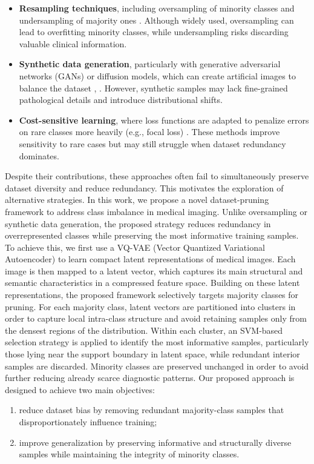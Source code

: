\documentclass[twocolumn]{svjour3}
\begin{document}
\begin{itemize}
 \item \textbf{Resampling techniques}, including oversampling of minority classes and undersampling of majority ones \cite{ref5}. Although widely used, oversampling can lead to overfitting minority classes, while undersampling risks discarding valuable clinical information.
 \item \textbf{Synthetic data generation}, particularly with generative adversarial networks (GANs) or diffusion models, which can create artificial images to balance the dataset \cite{ref6}, \cite{ref7}. However, synthetic samples may lack fine-grained pathological details and introduce distributional shifts.
 \item \textbf{Cost-sensitive learning}, where loss functions are adapted to penalize errors on rare classes more heavily (e.g., focal loss) \cite{ref8}. These methods improve sensitivity to rare cases but may still struggle when dataset redundancy dominates.
\end{itemize}
Despite their contributions, these approaches often fail to simultaneously preserve dataset diversity and reduce redundancy. This motivates the exploration of alternative strategies. In this work, we propose a novel dataset-pruning framework to address class imbalance in medical imaging.
Unlike oversampling or synthetic data generation, the proposed strategy reduces redundancy in overrepresented classes while preserving the most informative training samples. To achieve this, we first use a VQ-VAE (Vector Quantized Variational Autoencoder) \cite{ref9} to learn compact latent representations of medical images. Each image is then mapped to a latent vector, which captures its main structural and semantic characteristics in a compressed feature space. Building on these latent representations, the proposed framework selectively targets majority classes for pruning. For each majority class, latent vectors are partitioned into clusters in order to capture local intra-class structure and avoid retaining samples only from the densest regions of the distribution. Within each cluster, an SVM-based selection strategy is applied to identify the most informative samples, particularly those lying near the support boundary in latent space, while redundant interior samples are discarded. Minority classes are preserved unchanged in order to avoid further reducing already scarce diagnostic patterns.
Our proposed approach is designed to achieve two main objectives:
\begin{enumerate}
 \item reduce dataset bias by removing redundant majority-class samples that disproportionately influence training;
 \item improve generalization by preserving informative and structurally diverse samples while maintaining the integrity of minority classes.
\end{enumerate}
\end{document}
